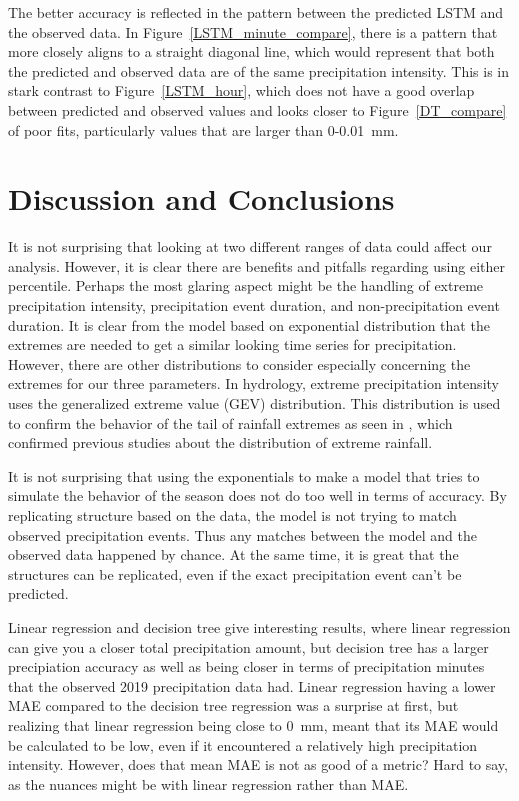 \documentclass[11pt]{report}
\begin{document}
The better accuracy is reflected in the pattern between the predicted LSTM and the observed data. In Figure~\ref{LSTM_minute_compare}, there is a pattern that more closely aligns to a straight diagonal line, which would represent that both the predicted and observed data are of the same precipitation intensity. This is in stark contrast to Figure~\ref{LSTM_hour}, which does not have a good overlap between predicted and observed values and looks closer to Figure~\ref{DT_compare} of poor fits, particularly values that are larger than 0-0.01~mm. 
\clearpage


\section{Discussion and Conclusions}\label{sec:conclusions}


It is not surprising that looking at two different ranges of data could
affect our analysis. However, it is clear there are benefits and pitfalls
regarding using either percentile. Perhaps the most glaring aspect might
be the handling of extreme precipitation intensity, precipitation event
duration, and non-precipitation event duration. It is clear from the
model based on exponential distribution that the extremes are needed to
get a similar looking time series for precipitation. However, there are
other distributions to consider especially concerning the extremes for
our three parameters. In hydrology,  extreme precipitation intensity uses 
the generalized extreme value (GEV) distribution. This distribution is 
used to confirm the behavior of the tail of rainfall extremes as seen 
in \cite[]{Hydro_dist}, which confirmed previous studies about the 
distribution of extreme rainfall.  

It is not surprising that using the exponentials to make a model 
that tries to simulate the behavior of the season does not do too 
well in terms of accuracy. By replicating structure based on the data, 
the model is not trying to match observed precipitation events. 
Thus any matches between the model and the observed data happened by chance.
At the same time, it is great that the structures can be replicated,
even if the exact precipitation event can't be predicted. 

Linear regression and decision tree give interesting results, where linear regression can give you a closer total precipitation amount, but decision tree has a larger precipiation accuracy as well as being closer in terms of precipitation minutes that the observed 2019 precipitation data had. Linear regression having a lower MAE compared to the decision tree regression was a surprise at first, but realizing that linear regression being close to 0~mm, meant that its MAE would be calculated to be low, even if it encountered a relatively high precipitation intensity. However, does that mean MAE is not as good of a metric? Hard to say, as the nuances might be with linear regression rather than MAE. 
\end{document}
